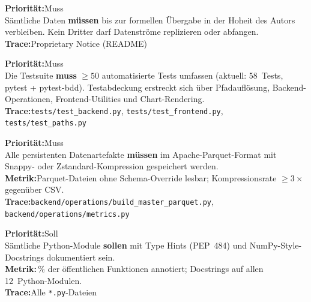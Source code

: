 \documentclass[11pt, a4paper, oneside, openany]{report}
\newcommand{\code}[1]{\texttt{\small\textcolor{DeepNavy}{#1}}}
\begin{document}
\vspace{6pt}

\begin{reqbox}
\textbf{Priorität:}\;Muss \\[4pt]
Sämtliche Daten \textbf{müssen} bis zur formellen Übergabe in der Hoheit des Autors verbleiben. Kein Dritter darf Datenströme replizieren oder abfangen. \\[4pt]
\textbf{Trace:}\;Proprietary Notice (README)
\end{reqbox}

\vspace{6pt}

\begin{reqbox}
\textbf{Priorität:}\;Muss \\[4pt]
Die Testsuite \textbf{muss} $\geq 50$ automatisierte Tests umfassen (aktuell: 58~Tests, pytest + pytest-bdd). Testabdeckung erstreckt sich über Pfadauflösung, Backend-Operationen, Frontend-Utilities und Chart-Rendering. \\[4pt]
\textbf{Trace:}\;\code{tests/test\_backend.py}, \code{tests/test\_frontend.py}, \code{tests/test\_paths.py}
\end{reqbox}

\vspace{6pt}

\begin{reqbox}
\textbf{Priorität:}\;Muss \\[4pt]
Alle persistenten Datenartefakte \textbf{müssen} im Apache-Parquet-Format mit Snappy- oder Zstandard-Kompression gespeichert werden. \\[4pt]
\textbf{Metrik:}\;Parquet-Dateien ohne Schema-Override lesbar; Kompressionsrate $\geq 3\times$ gegenüber CSV. \\[4pt]
\textbf{Trace:}\;\code{backend/operations/build\_master\_parquet.py}, \code{backend/operations/metrics.py}
\end{reqbox}

\vspace{6pt}

\begin{reqbox}
\textbf{Priorität:}\;Soll \\[4pt]
Sämtliche Python-Module \textbf{sollen} mit Type Hints (PEP~484) und NumPy-Style-Docstrings dokumentiert sein. \\[4pt]
\textbf{Metrik:}\,\% der öffentlichen Funktionen annotiert; Docstrings auf allen 12~Python-Modulen. \\[4pt]
\textbf{Trace:}\;Alle \code{*.py}-Dateien
\end{reqbox}
\end{document}

